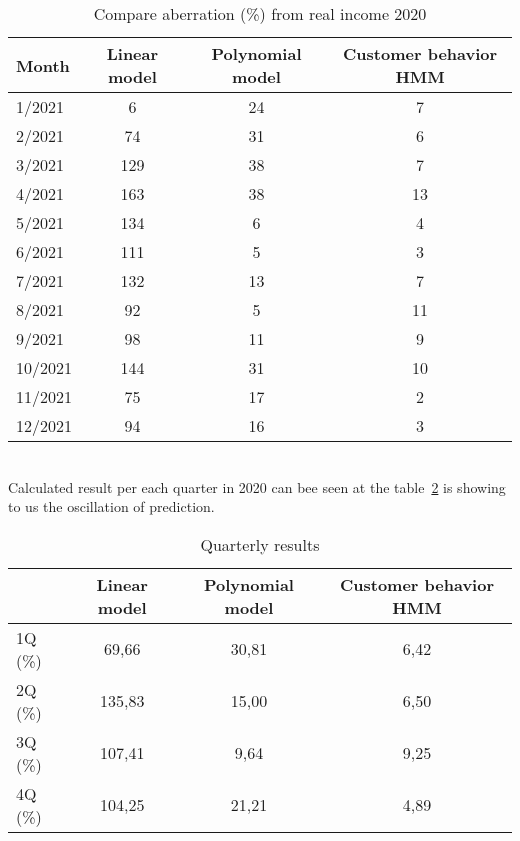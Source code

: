 \begin{table}[h!]
    \begin{center}
        \begin{tabular}{ | l | c | c | c |}
            \hline
            {\textbf{Month}} & \textbf{Linear model} & \textbf{Polynomial model} & \textbf{Customer behavior HMM}\\
            \hline
            1/2021 & 6 & 24 &  7\\
            2/2021 & 74 & 31 & 6\\
            3/2021 & 129 & 38 & 7\\
            4/2021 & 163 & 38 & 13\\
            5/2021 & 134 & 6 & 4\\
            6/2021 & 111 & 5 & 3\\
            7/2021 & 132 & 13 & 7\\
            8/2021 & 92 & 5 & 11\\
            9/2021 & 98 & 11 & 9\\
            10/2021 & 144 & 31 & 10\\
            11/2021 & 75 & 17 & 2\\
            12/2021 & 94 & 16 & 3\\
            \hline
        \end{tabular}
    \end{center}
    \caption{Compare aberration (\%) from real income 2020}
    \label{Compare results}
\end{table}\\
Calculated result per each quarter in 2020 can bee seen at the table~\ref{qResults} is showing to us the oscillation of prediction.
\begin{table}[h!]
    \begin{center}
        \begin{tabular}{ | l | c | c | c |}
            \hline
            & \textbf{Linear model} & \textbf{Polynomial model} & \textbf{Customer behavior HMM}\\
            \hline
            1Q (\%) & 69,66 & 30,81 & 6,42\\
            2Q (\%) & 135,83 & 15,00 & 6,50\\
            3Q (\%) & 107,41 & 9,64 & 9,25\\
            4Q (\%) & 104,25 & 21,21 & 4,89\\
            \hline
        \end{tabular}
    \end{center}
    \caption{Quarterly results}
    \label{qResults}
\end{table}
\newpage
